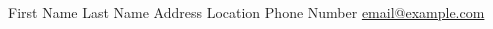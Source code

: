 \documentclass[lighthipster]{CV}
\newlength{\rightcolwidth}
\begin{document}
\begin{paracol}{2}
        \setlength{\parindent}{0pt}
        \begin{minipage}[t]{\rightcolwidth}
            \begin{center}\fontfamily{\sfdefault}\selectfont \color{black!70}
            {\small First Name Last Name  Address  Location  Phone Number \newline{} \protect\url{email@example.com}}
            \end{center}
        \end{minipage}

    \end{paracol}
\end{document}
